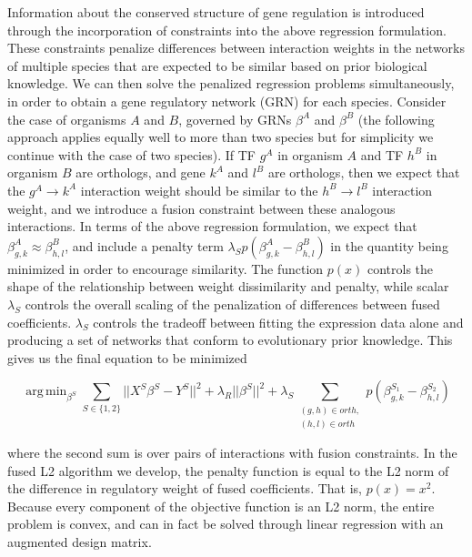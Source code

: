 \documentclass[11pt]{article}
\DeclareMathOperator*{\argmin}{arg\,min}
\begin{document}
Information about the conserved structure of gene regulation is introduced through the incorporation of constraints into the above regression formulation. These constraints penalize differences between interaction weights in the networks of multiple species that are expected to be similar based on prior biological knowledge. We can then solve the penalized regression problems simultaneously, in order to obtain a gene regulatory network (GRN) for each species. Consider the case of organisms $A$ and $B$, governed by GRNs $\beta^A$ and $\beta^B$ (the following approach applies equally well to more than two species but for simplicity we continue with the case of two species). If TF $g^A$ in organism $A$ and TF $h^B$ in organism $B$ are orthologs, and gene $k^A$ and $l^B$ are orthologs, then we expect that the $g^A \rightarrow k^A$ interaction weight should be similar to the $h^B \rightarrow l^B$ interaction weight, and we introduce a fusion constraint between these analogous interactions. In terms of the above regression formulation, we expect that $\beta^A_{g,k} \approx \beta^B_{h,l}$, and include a penalty term $\lambda_Sp(\beta^A_{g,k} - \beta^B_{h,l})$ in the quantity being minimized in order to encourage similarity. The function $p(x)$ controls the shape of the relationship between weight dissimilarity and penalty, while scalar $\lambda_S$ controls the overall scaling of the penalization of differences between fused coefficients. $\lambda_S$ controls the tradeoff between fitting the expression data alone and producing a set of networks that conform to evolutionary prior knowledge. This gives us the final equation to be minimized 

\begin{equation}
\argmin_{\beta^S} \displaystyle\sum_{S \in \{1, 2\}} \vert \vert X^S\beta^S - Y^S \vert \vert ^2 + \lambda_R \vert \vert \beta^S \vert \vert ^2 + \lambda_S \displaystyle \sum_{\substack{(g,h) \in orth,\\
 (h,l) \in orth}}p(\beta^{S_1}_{g,k} - \beta^{S_2}_{h,l})
\end{equation}

where the second sum is over pairs of interactions with fusion constraints. In the fused L2 algorithm we develop, the penalty function is equal to the L2 norm of the difference in regulatory weight of fused coefficients. That is, $p(x)=x^2$. Because every component of the objective function is an L2 norm, the entire problem is convex, and can in fact be solved through linear regression with an augmented design matrix. %
\end{document}

